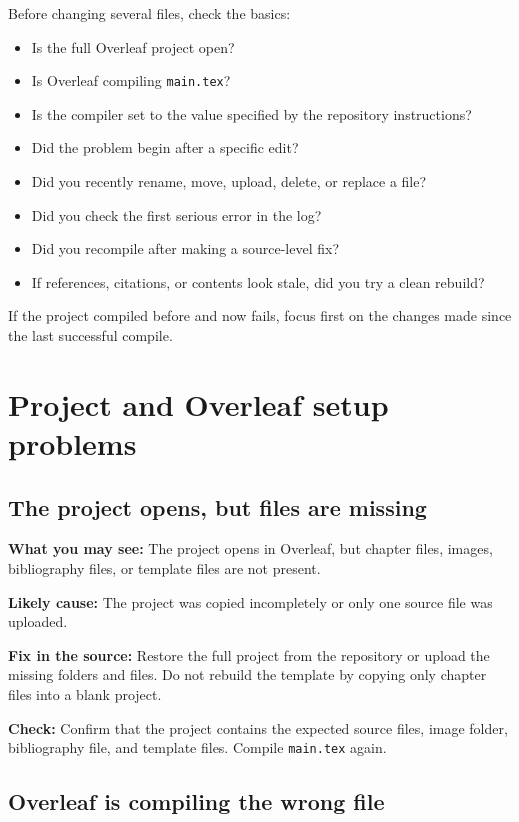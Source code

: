 Before changing several files, check the basics:

\begin{itemize}
  \item Is the full Overleaf project open?
  \item Is Overleaf compiling \texttt{main.tex}?
  \item Is the compiler set to the value specified by the repository instructions?
  \item Did the problem begin after a specific edit?
  \item Did you recently rename, move, upload, delete, or replace a file?
  \item Did you check the first serious error in the log?
  \item Did you recompile after making a source-level fix?
  \item If references, citations, or contents look stale, did you try a clean rebuild?
\end{itemize}

If the project compiled before and now fails, focus first on the changes made since the last successful compile.

\section{Project and Overleaf setup problems}
\label{sec:project-overleaf-setup-problems}

\subsection{The project opens, but files are missing}
\label{subsec:project-opens-files-missing}

\textbf{What you may see:} The project opens in Overleaf, but chapter files, images, bibliography files, or template files are not present.

\textbf{Likely cause:} The project was copied incompletely or only one source file was uploaded.

\textbf{Fix in the source:} Restore the full project from the repository or upload the missing folders and files. Do not rebuild the template by copying only chapter files into a blank project.

\textbf{Check:} Confirm that the project contains the expected source files, image folder, bibliography file, and template files. Compile \texttt{main.tex} again.

\subsection{Overleaf is compiling the wrong file}
\label{subsec:overleaf-compiling-wrong-file}

